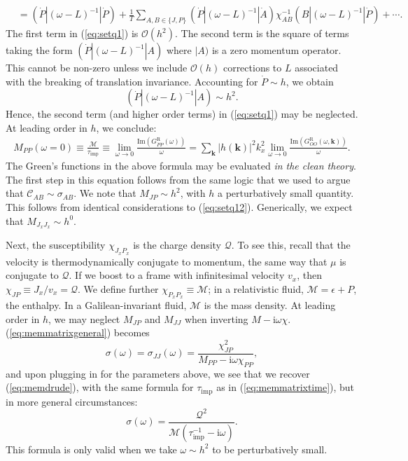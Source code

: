 \documentclass[10pt, oneside]{book}
\begin{document}
\begin{doublespace}
\begin{align}
&= (\dot{P}| (\omega-L)^{-1}|\dot{P}) + \frac{1}{T}\sum_{A,B\in \lbrace J,P\rbrace} (\dot{P}|(\omega-L)^{-1}|\dot{A})\chi^{-1}_{AB}(B| (\omega-L)^{-1}|\dot{P}) + \cdots.  \label{eq:setq1}
\end{align}The first term in (\ref{eq:setq1}) is $\mathcal{O}(h^2)$.  The second term is the square of terms taking the form $(\dot{P}| (\omega-L)^{-1}|A)$ where $|A)$ is a zero momentum operator.  This cannot be non-zero unless we include $\mathcal{O}(h)$ corrections to $L$ associated with the breaking of translation invariance.   Accounting for $\dot{P}\sim h$, we obtain \begin{equation}
(\dot{P}| (\omega-L)^{-1}|A)\sim h^2.  \label{eq:setq12}
\end{equation}   Hence, the second term (and higher order terms) in (\ref{eq:setq1}) may be neglected.  At leading order in $h$, we conclude: 
\begin{align}
M_{PP}(\omega = 0) \equiv \frac{\mathcal{M}}{\tau_{\mathrm{imp}}} \equiv \lim_{\omega\rightarrow 0} \frac{\mathrm{Im}\left(G^{\mathrm{R}}_{\dot{P}\dot{P}}(\omega)\right)}{\omega}  =  \sum_{\mathbf{k}} |h(\mathbf{k})|^2 k_x^2 \lim_{\omega\rightarrow 0} \frac{\mathrm{Im}\left(G^{\mathrm{R}}_{OO}(\omega,\mathbf{k})\right)}{\omega}.  \label{eq:memform2}
\end{align}
The Green's functions in the above formula may be evaluated \emph{in the clean theory}.
The first step in this equation follows from the same logic that we used to argue that $\mathcal{C}_{AB}\sim \sigma_{AB}$.     We note that $M_{JP}\sim h^2$, with $h$ a perturbatively small quantity.   This follows from identical considerations to (\ref{eq:setq12}).   Generically, we expect that $M_{J_xJ_x}\sim h^0$.

Next, the susceptibility $\chi_{J_xP_x}$ is the charge density $\mathcal{Q}$.   To see this, recall that the velocity is thermodynamically conjugate to momentum, the same way that $\mu$ is conjugate to $\mathcal{Q}$.   If we boost to a frame with infinitesimal velocity $v_x$,  then $\chi_{JP} \equiv J_x/v_x = \mathcal{Q}$.   We define further $\chi_{P_xP_x}\equiv \mathcal{M}$;    in  a relativistic fluid,  $\mathcal{M}  = \epsilon+P$, the enthalpy.   In a Galilean-invariant fluid, $\mathcal{M}$ is the mass density.   At leading order in $h$, we may neglect $M_{JP}$ and $M_{JJ}$ when inverting $M-\mathrm{i}\omega \chi$.   (\ref{eq:memmatrixgeneral}) becomes \begin{equation}
\sigma(\omega) = \sigma_{JJ}(\omega) = \frac{\chi_{JP}^2}{M_{PP} - \mathrm{i}\omega \chi_{PP}},  \label{eq:memform1}
\end{equation}
and upon plugging in for the parameters above, we see that we recover (\ref{eq:memdrude}), with the same formula for $\tau_{\mathrm{imp}}$ as in (\ref{eq:memmatrixtime}), but in more general circumstances: \begin{equation}
\sigma(\omega) = \frac{\mathcal{Q}^2}{\mathcal{M}(\tau_{\mathrm{imp}}^{-1}-\mathrm{i}\omega)}.
\end{equation}   This formula is only valid when we take $\omega \sim h^2$ to be perturbatively small.


\end{doublespace}
\end{document}
